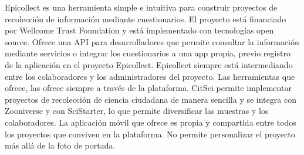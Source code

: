 Epicollect es una herramienta simple e intuitiva para construir proyectos de recolección de información mediante cuestionarios. El proyecto está financiado por Wellcome Trust Foundation y está implementado con tecnologías open source. Ofrece una API para desarrolladores que permite consultar la información mediante servicios o integrar los cuestionarios a una app propia, previo registro de la aplicación en el proyecto Epicollect. Epicollect siempre está intermediando entre los colaboradores y los administradores del proyecto. Las herramientas que ofrece, las ofrece siempre a través de la plataforma. CitSci permite implementar proyectos de recolección de ciencia ciudadana de manera sencilla y se integra con Zooniverse y con SciStarter, lo que permite diversificar las muestras y los colaboradores. La aplicación móvil que ofrece es propia y compartida entre todos los proyectos que conviven en la plataforma. No permite personalizar el proyecto más allá de la foto de portada.


